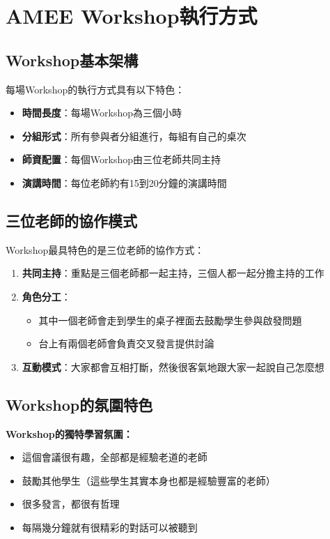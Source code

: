 \documentclass[12pt,a4paper]{article}
\begin{document}
\section{AMEE Workshop執行方式}

\subsection{Workshop基本架構}

每場Workshop的執行方式具有以下特色：

\begin{itemize}[nosep]
    \item \textbf{時間長度}：每場Workshop為三個小時
    \item \textbf{分組形式}：所有參與者分組進行，每組有自己的桌次
    \item \textbf{師資配置}：每個Workshop由三位老師共同主持
    \item \textbf{演講時間}：每位老師約有15到20分鐘的演講時間
\end{itemize}

\subsection{三位老師的協作模式}

Workshop最具特色的是三位老師的協作方式：

\begin{enumerate}
    \item \textbf{共同主持}：重點是三個老師都一起主持，三個人都一起分擔主持的工作
    \item \textbf{角色分工}：
    \begin{itemize}[nosep]
        \item 其中一個老師會走到學生的桌子裡面去鼓勵學生參與啟發問題
        \item 台上有兩個老師會負責交叉發言提供討論
    \end{itemize}
    \item \textbf{互動模式}：大家都會互相打斷，然後很客氣地跟大家一起說自己怎麼想
\end{enumerate}

\subsection{Workshop的氛圍特色}

\begin{importantbox}
\textbf{Workshop的獨特學習氛圍：}
\begin{itemize}[nosep]
    \item 這個會議很有趣，全部都是經驗老道的老師
    \item 鼓勵其他學生（這些學生其實本身也都是經驗豐富的老師）
    \item 很多發言，都很有哲理
    \item 每隔幾分鐘就有很精彩的對話可以被聽到
\end{itemize}
\end{importantbox}
\end{document}
